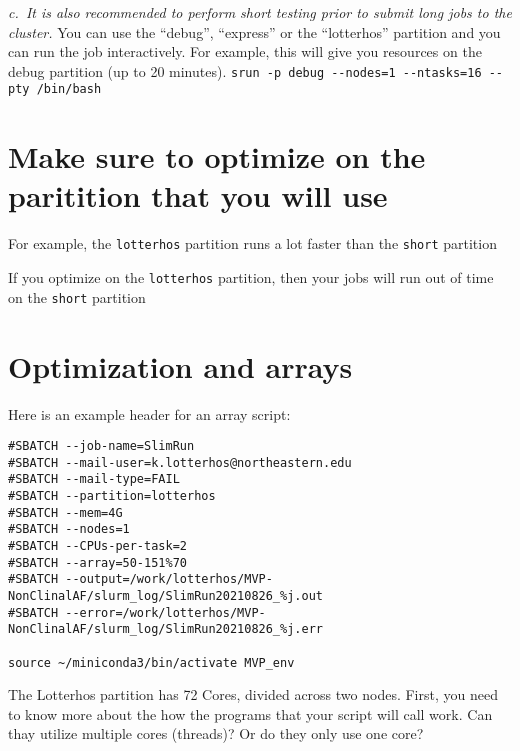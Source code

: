 \documentclass[
  letterpaper,
  DIV=11,
  numbers=noendperiod]{scrreprt}
\begin{document}
\emph{c.~It is also recommended to perform short testing prior to submit
long jobs to the cluster.} You can use the ``debug'', ``express'' or the
``lotterhos'' partition and you can run the job interactively. For
example, this will give you resources on the debug partition (up to 20
minutes).
\texttt{srun\ -p\ debug\ -\/-nodes=1\ -\/-ntasks=16\ -\/-pty\ /bin/bash}

\hypertarget{make-sure-to-optimize-on-the-paritition-that-you-will-use}{%
\section*{\texorpdfstring{\textbf{Make sure to optimize on the
paritition that you will
use}}{Make sure to optimize on the paritition that you will use}}\label{make-sure-to-optimize-on-the-paritition-that-you-will-use}}

For example, the \texttt{lotterhos} partition runs a lot faster than the
\texttt{short} partition

If you optimize on the \texttt{lotterhos} partition, then your jobs will
run out of time on the \texttt{short} partition

\hypertarget{optimization-and-arrays}{%
\section*{\texorpdfstring{\textbf{Optimization and
arrays}}{Optimization and arrays}}\label{optimization-and-arrays}}

Here is an example header for an array script:

\begin{verbatim}
#SBATCH --job-name=SlimRun
#SBATCH --mail-user=k.lotterhos@northeastern.edu
#SBATCH --mail-type=FAIL
#SBATCH --partition=lotterhos
#SBATCH --mem=4G
#SBATCH --nodes=1
#SBATCH --CPUs-per-task=2
#SBATCH --array=50-151%70
#SBATCH --output=/work/lotterhos/MVP-NonClinalAF/slurm_log/SlimRun20210826_%j.out
#SBATCH --error=/work/lotterhos/MVP-NonClinalAF/slurm_log/SlimRun20210826_%j.err

source ~/miniconda3/bin/activate MVP_env
\end{verbatim}

The Lotterhos partition has 72 Cores, divided across two nodes. First,
you need to know more about the how the programs that your script will
call work. Can thay utilize multiple cores (threads)? Or do they only
use one core?
\end{document}
